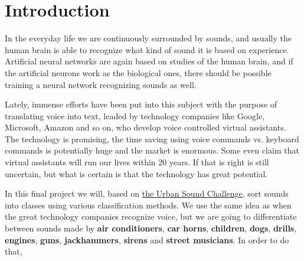 \section{Introduction} \label{sec:introduction}
In the everyday life we are continuously surrounded by sounds, and usually the human brain is able to recognize what kind of sound it is based on experience. Artificial neural networks are again based on studies of the human brain, and if the artificial neurons work as the biological ones, there should be possible training a neural network recognizing sounds as well. 

Lately, immense efforts have been put into this subject with the purpose of translating voice into text, leaded by technology companies like Google, Microsoft, Amazon and so on, who develop voice controlled virtual assistants. The technology is promising, the time saving using voice commands vs. keyboard commands is potentially huge and the market is enormous. Some even claim that virtual assistants will run our lives within 20 years. \cite{Feloni} If that is right is still uncertain, but what is certain is that the technology has great potential.

In this final project we will, based on \href{https://datahack.analyticsvidhya.com/contest/practice-problem-urban-sound-classification/}{the Urban Sound Challenge}, sort sounds into classes using various classification methods. We use the same idea as when the great technology companies recognize voice, but we are going to differentiate between sounds made by \textbf{air conditioners}, \textbf{car horns}, \textbf{children}, \textbf{dogs}, \textbf{drills}, \textbf{engines}, \textbf{guns}, \textbf{jackhammers}, \textbf{sirens} and \textbf{street musicians}. In order to do that, 


